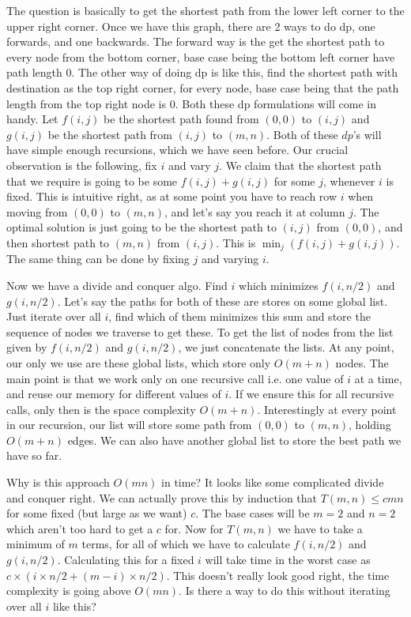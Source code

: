 \documentclass[12pt]{report}
\begin{document}
\begin{enumerate}[label=\textbf{\arabic*.}]
  The question is basically to get the shortest path from the lower left corner to the upper right corner. Once we have this graph, there are 2 ways to do dp, one forwards, and one backwards. The forward way is the get the shortest path
  to every node from the bottom corner, base case being the bottom left corner have path length 0. The other way of doing dp is like this, find the shortest path with destination as the top right corner, for every node, base case being that
  the path length from the top right node is 0. Both these dp formulations will come in handy. Let $f(i,j)$ be the shortest path found from $(0,0)$ to $(i,j)$ and $g(i,j)$ be the shortest path from $(i,j)$ to $(m,n)$. Both of these $dp$'s will
  have simple enough recursions, which we have seen before. Our crucial observation is the following, fix $i$ and vary $j$. We claim that the shortest path that we require is going to be some $f(i,j) + g(i,j)$ for some $j$, whenever $i$ is
  fixed. This is intuitive right, as at some point you have to reach row $i$ when moving from $(0,0)$ to $(m,n)$, and let's say you reach it at column $j$. The optimal solution is just going to be the shortest path to $(i,j)$ from $(0,0)$,
  and then shortest path to $(m,n)$ from $(i,j)$. This is $\min_j (f(i,j) + g(i,j))$. The same thing can be done by fixing $j$ and varying $i$.

  Now we have a divide and conquer algo. Find $i$ which minimizes $f(i,n/2)$ and $g(i,n/2)$. Let's say the paths for both of these are stores on some global list. Just iterate over all $i$, find which of them minimizes this sum and store the 
  sequence of nodes we traverse to get these. To get the list of nodes from the list given by $f(i,n/2)$ and $g(i,n/2)$, we just concatenate the lists. At any point, our only we use are these global lists, which store only $O(m+n)$ nodes.
  The main point is that we work only on one recursive call i.e. one value of $i$ at a time, and reuse our memory for different values of $i$. If we ensure this for all recursive calls, only then is the space complexity $O(m+n)$. Interestingly
  at every point in our recursion, our list will store some path from $(0,0)$ to $(m,n)$, holding $O(m+n)$ edges. We can also have another global list to store the best path we have so far.

  Why is this approach $O(mn)$ in time? It looks like some complicated divide and conquer right. We can actually prove this by induction that $T(m,n) \leq cmn$ for some fixed (but large as we want) $c$. The base cases will be $m = 2$ and $n = 2$ 
  which aren't too hard to get a $c$ for. Now for $T(m,n)$ we have to take a minimum of $m$ terms, for all of which we have to calculate $f(i, n/2)$ and $g(i, n/2)$. Calculating this for a fixed $i$ will take time in the worst case as
  $c \times (i \times n/2 + (m-i) \times n/2)$. This doesn't really look good right, the time complexity is going above $O(mn)$. Is there a way to do this without iterating over all $i$ like this?


\end{enumerate}
\end{document}
